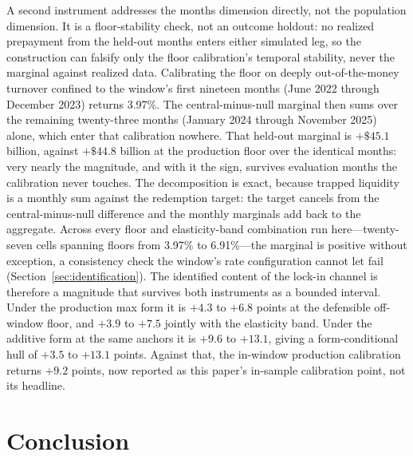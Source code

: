 \documentclass[12pt]{article}
\begin{document}
A second instrument addresses the months dimension directly, not the population dimension. It is a floor-stability check, not an outcome holdout: no realized prepayment from the held-out months enters either simulated leg, so the construction can falsify only the floor calibration's temporal stability, never the marginal against realized data. Calibrating the floor on deeply out-of-the-money turnover confined to the window's first nineteen months (June 2022 through December 2023) returns 3.97\%. The central-minus-null marginal then sums over the remaining twenty-three months (January 2024 through November 2025) alone, which enter that calibration nowhere. That held-out marginal is $+\$45.1$ billion, against $+\$44.8$ billion at the production floor over the identical months: very nearly the magnitude, and with it the sign, survives evaluation months the calibration never touches. The decomposition is exact, because trapped liquidity is a monthly sum against the redemption target: the target cancels from the central-minus-null difference and the monthly marginals add back to the aggregate. Across every floor and elasticity-band combination run here---twenty-seven cells spanning floors from 3.97\% to 6.91\%---the marginal is positive without exception, a consistency check the window's rate configuration cannot let fail (Section~\ref{sec:identification}). The identified content of the lock-in channel is therefore a magnitude that survives both instruments as a bounded interval. Under the production max form it is $+4.3$ to $+6.8$ points at the defensible off-window floor, and $+3.9$ to $+7.5$ jointly with the elasticity band. Under the additive form at the same anchors it is $+9.6$ to $+13.1$, giving a form-conditional hull of $+3.5$ to $+13.1$ points. Against that, the in-window production calibration returns $+9.2$ points, now reported as this paper's in-sample calibration point, not its headline.


\section{Conclusion}\label{sec:conclusion}
\end{document}
